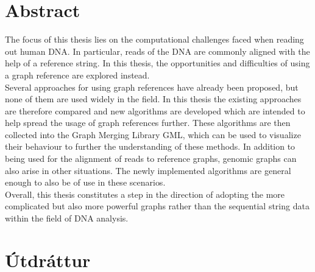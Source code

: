 \documentclass[a4paper,12pt,twoside,BCOR=10mm]{scrbook}
\begin{document}

\setcounter{page}{5}
\section*{\huge Abstract}


The focus of this thesis lies on the computational challenges faced when reading out human DNA.
In particular, reads of the DNA are commonly aligned with the help of a reference string.
In this thesis, the opportunities and difficulties of using a graph reference are explored instead. \\
Several approaches for using graph references have already been proposed,
but none of them are used widely in the field.
In this thesis the existing approaches are therefore compared and
new algorithms are developed which are intended to help spread
the usage of graph references further.
These algorithms are then collected into the Graph Merging Library GML,
which can be used to visualize their behaviour to further the understanding
of these methods.
In addition to being used for the alignment of reads to reference graphs,
genomic graphs can also arise in other situations.
The newly implemented algorithms are general enough to also be of use in these scenarios. \\
Overall, this thesis constitutes a step in the direction of adopting
the more complicated but also more powerful graphs rather than the sequential string data
within the field of DNA analysis.

\vspace*{1cm}
\section*{\huge Útdráttur}

\end{document}
